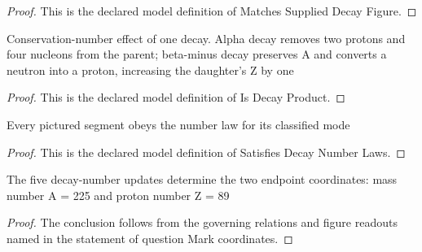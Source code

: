 \begin{proof}
  This is the declared model definition of Matches Supplied Decay Figure.
\end{proof}
\begin{definition}
  \label{def:physics:phyx-mini-0574:phyxminiproblems-problemphyxmini0574-isdecayproduct}
  Conservation-number effect of one decay. Alpha decay removes two protons and four nucleons from the parent; beta-minus decay preserves A and converts a neutron into a proton, increasing the daughter's Z by one
\end{definition}
\begin{proof}
  This is the declared model definition of Is Decay Product.
\end{proof}
\begin{definition}
  \label{def:physics:phyx-mini-0574:phyxminiproblems-problemphyxmini0574-satisfiesdecaynumberlaws}
  Every pictured segment obeys the number law for its classified mode
\end{definition}
\begin{proof}
  This is the declared model definition of Satisfies Decay Number Laws.
\end{proof}
\begin{theorem}
  \label{thm:physics:phyx-mini-0574:phyxminiproblems-problemphyxmini0574-questionmark-coordinates}
  The five decay-number updates determine the two endpoint coordinates: mass number A = 225 and proton number Z = 89
\end{theorem}
\begin{proof}
  The conclusion follows from the governing relations and figure readouts named in the statement of question Mark coordinates.
\end{proof}
